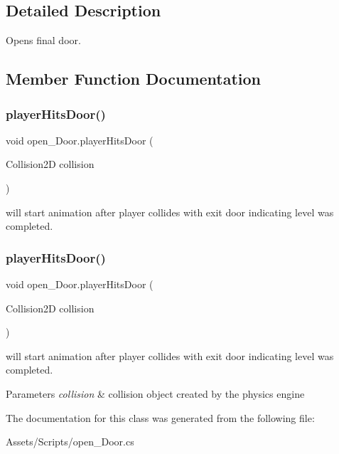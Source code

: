 \subsection{Detailed Description}
Opens final door. 

\subsection{Member Function Documentation}
\mbox{\label{classopen___door_af445b9df0f862ee2c2d667d6b1f92811}} 
\subsubsection{\texorpdfstring{player\+Hits\+Door()}{playerHitsDoor()}\hspace{0.1cm}{\footnotesize\ttfamily [1/2]}}
{\footnotesize\ttfamily void open\+\_\+\+Door.\+player\+Hits\+Door (\begin{DoxyParamCaption}\item[{Collision2D}]{collision }\end{DoxyParamCaption})\hspace{0.3cm}{\ttfamily [inline]}}

will start animation after player collides with exit door indicating level was completed. \mbox{\label{classopen___door_af445b9df0f862ee2c2d667d6b1f92811}} 
\subsubsection{\texorpdfstring{player\+Hits\+Door()}{playerHitsDoor()}\hspace{0.1cm}{\footnotesize\ttfamily [2/2]}}
{\footnotesize\ttfamily void open\+\_\+\+Door.\+player\+Hits\+Door (\begin{DoxyParamCaption}\item[{Collision2D}]{collision }\end{DoxyParamCaption})\hspace{0.3cm}{\ttfamily [inline]}}

will start animation after player collides with exit door indicating level was completed. 
\begin{DoxyParams}{Parameters}
{\em collision} & collision object created by the physics engine \\
\hline
\end{DoxyParams}


The documentation for this class was generated from the following file\+:\begin{DoxyCompactItemize}
\item 
Assets/\+Scripts/open\+\_\+\+Door.\+cs\end{DoxyCompactItemize}
